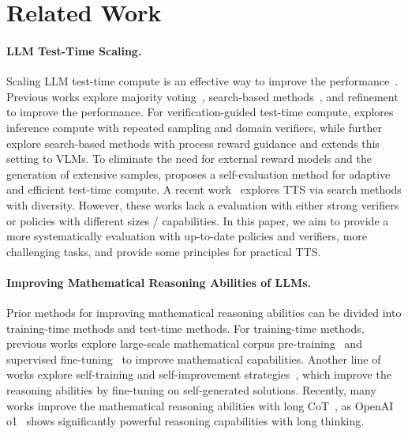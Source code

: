 \section{Related Work}
\paragraph{LLM Test-Time Scaling.}

Scaling LLM test-time compute is an effective way to improve the performance~\citep{o1}. Previous works explore majority voting~\citep{Self-Consistency}, search-based methods~\citep{ToT, xie2024self, ARGS, wan2024alphazero}, and refinement~\citep{RISE} to improve the performance. For verification-guided test-time compute, \citet{brown2024large} explores inference compute with repeated sampling and domain verifiers, while \citet{MindStar, wu2024inference, snell2024scaling} further explore search-based methods with process reward guidance and \citet{xiyao2024scaling} extends this setting to VLMs. To eliminate the need for external reward models and the generation of extensive samples, \citet{manvi2024adaptive} proposes a self-evaluation method for adaptive and efficient test-time compute. A recent work~\citep{huggingface2024scaling} explores TTS via search methods with diversity. However, these works lack a evaluation with either strong verifiers or policies with different sizes / capabilities.
In this paper, we aim to provide a more systematically evaluation with up-to-date policies and verifiers, more challenging tasks, and provide some principles for practical TTS.


\paragraph{Improving Mathematical Reasoning Abilities of LLMs.}

Prior methods for improving mathematical reasoning abilities can be divided into training-time methods and test-time methods.
For training-time methods, previous works explore large-scale mathematical corpus pre-training~\citep{GPT-4, Llemma, DeepSeekMath} and supervised fine-tuning~\citep{Wizardmath, MetaMath, ToRA, MathScale, DART-Math, Skywork-Math} to improve mathematical capabilities.
Another line of works explore self-training and self-improvement strategies~\citep{STaR, ReST, ReFT, V-STaR, Quiet-STaR, ReST-MCTS*, setlur2024rl, kumar2024training, PRIME}, which improve the reasoning abilities by fine-tuning on self-generated solutions.
Recently, many works improve the mathematical reasoning abilities with long CoT~\citep{o1-Journey1, o1-Journey2, k0-math, DeepSeek-R1, QwQ, Skywork-o1, Marco-o1}, as OpenAI o1~\citep{o1} shows significantly powerful reasoning capabilities with long thinking.

